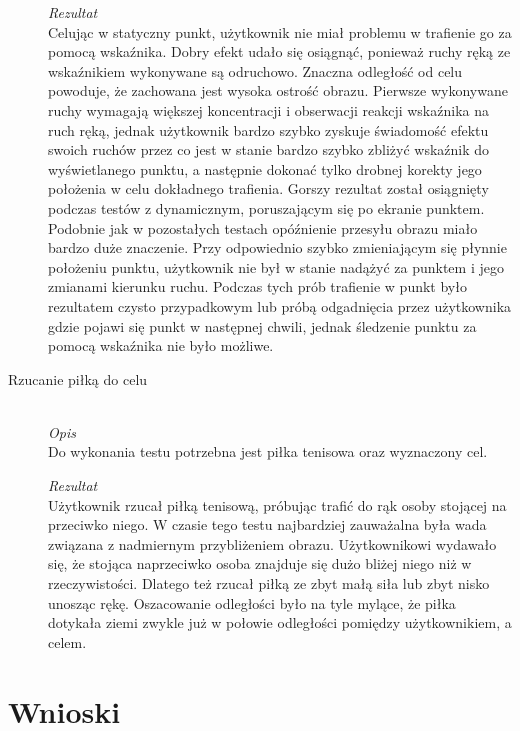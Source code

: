 \documentclass[a4paper,11pt,twoside]{report}
\theoremstyle{definition}
\begin{document}
\begin{description}
\textit{Rezultat} \\
Celując w statyczny punkt, użytkownik nie miał problemu w trafienie go za pomocą wskaźnika. Dobry efekt udało się osiągnąć, ponieważ ruchy ręką ze wskaźnikiem wykonywane są odruchowo. Znaczna odległość od celu powoduje, że zachowana jest wysoka ostrość obrazu. Pierwsze wykonywane ruchy wymagają większej koncentracji i obserwacji reakcji wskaźnika na ruch ręką, jednak użytkownik bardzo szybko zyskuje świadomość efektu swoich ruchów przez co jest w stanie bardzo szybko zbliżyć wskaźnik do wyświetlanego punktu, a następnie dokonać tylko drobnej korekty jego położenia w celu dokładnego trafienia. Gorszy rezultat został osiągnięty podczas testów z dynamicznym, poruszającym się po ekranie punktem. Podobnie jak w pozostałych testach opóźnienie przesyłu obrazu miało bardzo duże znaczenie. Przy odpowiednio szybko zmieniającym się płynnie położeniu punktu, użytkownik nie był w stanie nadążyć za punktem i jego zmianami kierunku ruchu. Podczas tych prób trafienie w punkt było rezultatem czysto przypadkowym lub próbą odgadnięcia przez użytkownika gdzie pojawi się punkt w następnej chwili, jednak śledzenie punktu  za pomocą wskaźnika nie było możliwe.

\item[Rzucanie piłką do celu] \hfill \\
\textit{Opis} \\
Do wykonania testu potrzebna jest piłka tenisowa oraz wyznaczony cel. 

\textit{Rezultat} \\
Użytkownik rzucał piłką tenisową, próbując trafić do rąk osoby stojącej na przeciwko niego. W czasie tego testu najbardziej zauważalna była wada związana z nadmiernym przybliżeniem obrazu. Użytkownikowi wydawało się, że stojąca naprzeciwko osoba znajduje się dużo bliżej niego niż w rzeczywistości. Dlatego też rzucał piłką ze zbyt małą siła lub zbyt nisko unosząc rękę. Oszacowanie odległości było na tyle mylące, że piłka dotykała ziemi zwykle już w połowie odległości pomiędzy użytkownikiem, a celem.

\end{description}

\section{Wnioski}
\end{document}
